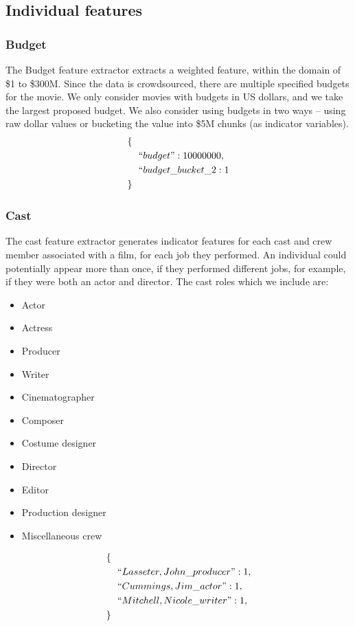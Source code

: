 \documentclass[journal]{IEEEtran}
\begin{document}
\subsection{Individual features}
\subsubsection{Budget}
The Budget feature extractor extracts a weighted feature, within the domain of
\$1 to \$300M.  Since the data is crowdsourced, there are multiple specified
budgets for the movie.  We only consider movies with budgets in US dollars, and
we take the largest proposed budget.  We also consider using budgets in two
ways -- using raw dollar values or bucketing the value into \$5M chunks (as
indicator variables).
\begin{align*}
        \{ \ \ & \\
        &``budget": 10000000,\\
        &``budget\_bucket\_2: 1\\
        \} \ \ &
\end{align*}

\subsubsection{Cast}
The cast feature extractor generates indicator features for each
cast and crew member associated with a film, for each job they
performed.  An individual could potentially appear more than once,
if they performed different jobs, for example, if they were both
an actor and director.  The cast roles which we include are:
\begin{itemize}
	\item Actor
	\item Actress
	\item Producer
	\item Writer
	\item Cinematographer
	\item Composer
	\item Costume designer
	\item Director
	\item Editor
	\item Production designer
	\item Miscellaneous crew
\end{itemize}
\begin{align*}
        \{ \ \ & \\
        &``Lasseter,John\_producer": 1,\\
        &``Cummings,Jim\_actor": 1,\\
        &``Mitchell,Nicole\_writer": 1,\\
        \} \ \ &
\end{align*}
\end{document}
